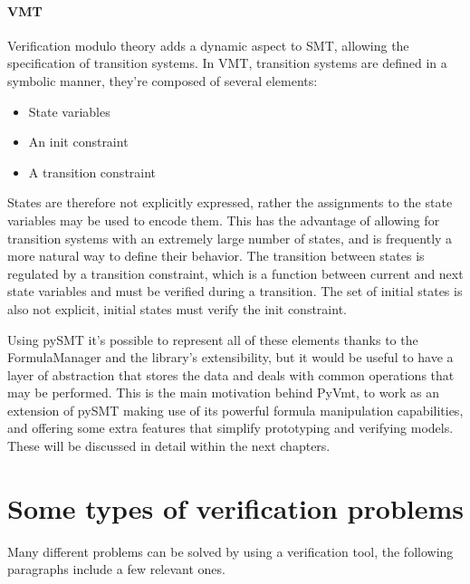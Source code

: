 \paragraph*{VMT}

Verification modulo theory adds a dynamic aspect to SMT, allowing the specification of transition systems. In VMT, transition systems are defined in a symbolic manner, they're composed of several elements:
\begin{itemize}
    \item State variables
    \item An init constraint
    \item A transition constraint
\end{itemize}
States are therefore not explicitly expressed, rather the assignments to the state variables may be used to encode them.
This has the advantage of allowing for transition systems with an extremely large number of states, and is frequently a more natural way to define their behavior.
The transition between states is regulated by a transition constraint, which is a function between current and next state variables and must be verified during a transition. The set of initial states is also not explicit, initial states must verify the init constraint.

Using pySMT it's possible to represent all of these elements thanks to the FormulaManager and the library's extensibility, but it would be useful to have a layer of abstraction that stores the data and deals with common operations that may be performed.
This is the main motivation behind PyVmt, to work as an extension of pySMT making use of its powerful formula manipulation capabilities, and offering some extra features that simplify prototyping and verifying models. These will be discussed in detail within the next chapters.


\section{Some types of verification problems}
Many different problems can be solved by using a verification tool, the following paragraphs include a few relevant ones.

